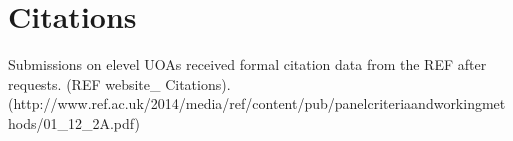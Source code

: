 \documentclass[a4paper,11pt]{article}
\begin{document}
\section{Citations \label{S:Citations}}

Submissions on elevel UOAs received formal citation data from the REF after requests. (REF website_ Citations). (http://www.ref.ac.uk/2014/media/ref/content/pub/panelcriteriaandworkingmethods/01_12_2A.pdf)



{}
\end{document}
